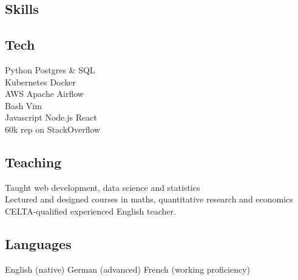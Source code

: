 \documentclass[a4paper,nomath]{deedy-resume} %
\begin{document}
\begin{paracol}{2}
    \sectionspace %


\switchcolumn
%


    \section{Skills}

    \subsection{Tech}

    Python \textbullet{} Postgres \& SQL \\
    Kubernetes \textbullet{} Docker \\
    AWS \textbullet{} Apache Airflow \\
    Bash \textbullet{} Vim \\
    Javascript \textbullet{} Node.js \textbullet{} React \\
    60k rep on StackOverflow \\

    \sectionspace %

    \subsection{Teaching}
    \textbullet{} Taught web development, data science and statistics \\
    \textbullet{} Lectured and designed courses in maths, quantitative research and economics \\
    \textbullet{} CELTA-qualified experienced English teacher. \\
    
    \sectionspace %

    \subsection{Languages}
    English (native) \textbullet{} German (advanced) \textbullet{} French (working proficiency)


\end{paracol}
\end{document}
